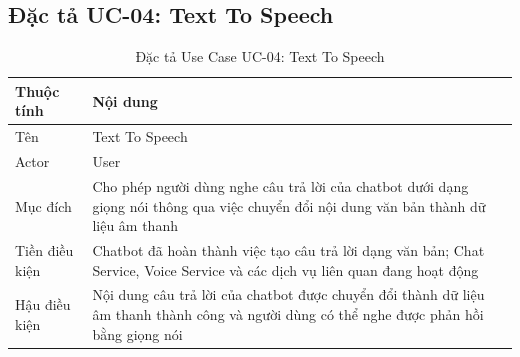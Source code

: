 \documentclass[../DoAn.tex]{subfiles}
\begin{document}
\subsection{Đặc tả UC-04: Text To Speech}
\begin{table}[htbp]
    \centering
    \renewcommand{\arraystretch}{1.4}
    \begin{tabular}{|l|p{10cm}|}
        \hline
        \textbf{Thuộc tính} & \textbf{Nội dung}                                                                                                                         \\
        \hline
        Tên                 & Text To Speech                                                                                                                            \\
        \hline
        Actor               & User                                                                                                                                      \\
        \hline
        Mục đích            & Cho phép người dùng nghe câu trả lời của chatbot dưới dạng giọng nói thông qua việc chuyển đổi nội dung văn bản thành dữ liệu âm thanh    \\
        \hline
        Tiền điều kiện      & Chatbot đã hoàn thành việc tạo câu trả lời dạng văn bản; Chat Service, Voice Service và các dịch vụ liên quan đang hoạt động              \\
        \hline
        Hậu điều kiện       & Nội dung câu trả lời của chatbot được chuyển đổi thành dữ liệu âm thanh thành công và người dùng có thể nghe được phản hồi bằng giọng nói \\
        \hline
    \end{tabular}
    \caption{Đặc tả Use Case UC-04: Text To Speech}
    \label{tab:usecase-text-to-speech}
\end{table}
\end{document}

